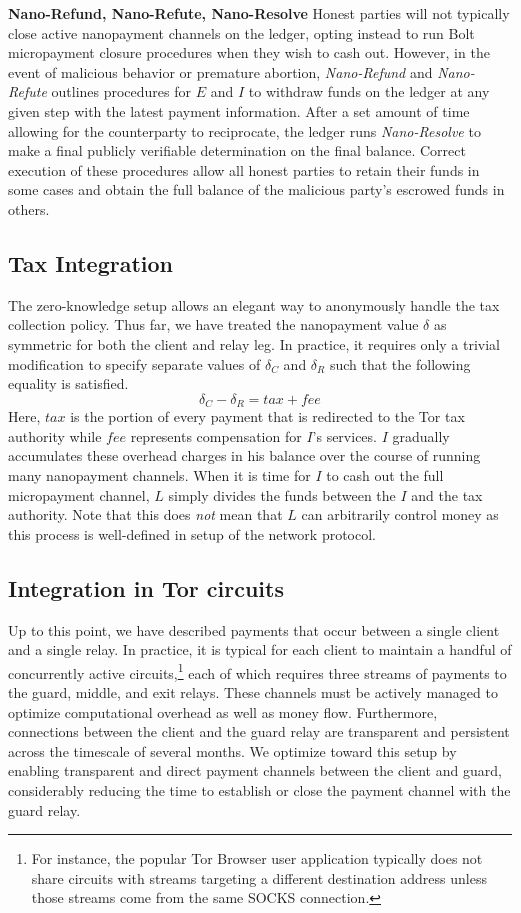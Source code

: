 \textbf{Nano-Refund, Nano-Refute, Nano-Resolve} Honest parties will not typically
close active nanopayment channels on the ledger, opting instead to run Bolt
micropayment closure procedures when they wish to cash out. However, in the
event of malicious behavior or premature abortion, \emph{Nano-Refund} and
\emph{Nano-Refute} outlines procedures for $E$ and $I$ to withdraw funds on the
ledger at any given step with the latest payment information. After a set amount
of time allowing for the counterparty to reciprocate, the ledger runs
\emph{Nano-Resolve} to make a final publicly verifiable determination on the final
balance. Correct execution of these procedures allow all honest parties to
retain their funds in some cases and obtain the full balance of the malicious
party's escrowed funds in others.

\subsection{Tax Integration}

The zero-knowledge setup allows an elegant way to anonymously handle the
tax collection policy. Thus far, we have
treated the nanopayment value $\delta$ as symmetric for both the client and
relay leg. In practice, it requires only a trivial modification to specify
separate values of $\delta_C$ and $\delta_R$ such that the following equality is
satisfied.
\begin{equation}
  \delta_C - \delta_R = tax + fee
  \label{eq:payment}
\end{equation}
Here, $tax$ is the portion of every payment that is redirected to the Tor tax
authority while $fee$ represents compensation for $I$'s services. $I$ gradually
accumulates these overhead charges in his balance over the course of running
many nanopayment channels. When it is time for $I$ to cash out the full
micropayment channel, $L$ simply divides the funds between the $I$ and the tax
authority. Note that this does \emph{not} mean that $L$ can arbitrarily control
money as this process is well-defined in setup of the network protocol.

\subsection{Integration in Tor circuits}
Up to this point, we have described payments that occur between a single client
and a single relay. In practice, it is typical for each client to maintain a
handful of concurrently active circuits,\footnote{For instance, the popular Tor
  Browser user application typically does not share circuits with streams targeting a different destination address unless those streams come from the same SOCKS connection.}  each of
which requires three streams of payments to the guard, middle, and exit
relays. These channels must be actively managed to optimize computational
overhead as well as money flow. Furthermore, connections between the client and
the guard relay are transparent and persistent across the timescale of several
months. We optimize toward this setup by enabling transparent and direct payment
channels between the client and guard, considerably reducing the time to establish or close the payment channel with the guard relay. 
